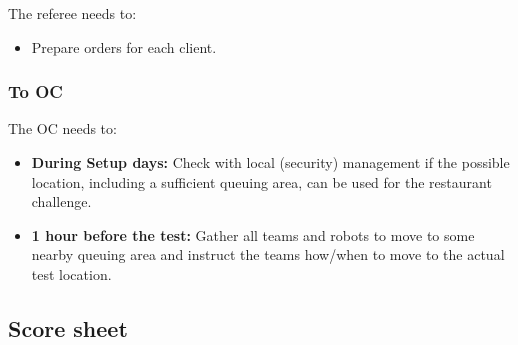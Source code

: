 The referee needs to:
\begin{itemize}
	\item Prepare orders for each client.
\end{itemize}

\subsubsection*{To OC}
The OC needs to:
\begin{itemize}[nosep]
	\item \textbf{During Setup days:} Check with local (security) management if the possible location, including a sufficient queuing area, can be used for the restaurant challenge.
	\item \textbf{1 hour before the test:} Gather all teams and robots to move to some nearby queuing area and instruct the teams how/when to move to the actual test location.
\end{itemize}

\newpage
\subsection*{Score sheet}


\cleardoublepage{}
